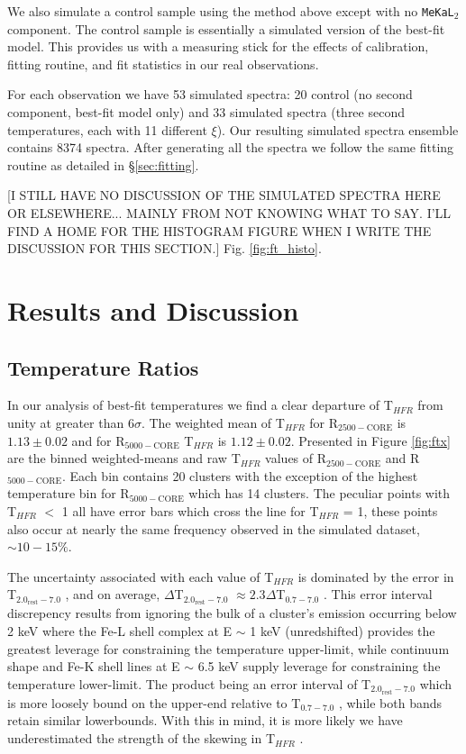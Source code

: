 \documentclass{emulateapj}
\newcommand{\tf}{T$_{HFR}$ }
\newcommand{\hard}{T$_{2.0_{\text{rest}}-7.0}$ }
\newcommand{\full}{T$_{0.7-7.0}$ }
\begin{document}
We also simulate a control sample using the method above except with no
{\tt MeKaL$_2$} component. The control sample is essentially a simulated
version of the best-fit model. This provides us with a measuring stick for
the effects of calibration, fitting routine, and fit statistics in our
real observations.

For each observation we have 53 simulated spectra: 20 control (no second
component, best-fit model only) and 33 simulated spectra (three second
temperatures, each with 11 different $\xi$). Our resulting simulated
spectra ensemble contains 8374 spectra. After generating all the
spectra we follow the same fitting routine as detailed in
\S\ref{sec:fitting}.

[I STILL HAVE NO DISCUSSION OF THE SIMULATED SPECTRA HERE OR
ELSEWHERE... MAINLY FROM NOT KNOWING WHAT TO SAY. I'LL FIND A HOME FOR
THE HISTOGRAM FIGURE WHEN I WRITE THE DISCUSSION FOR THIS SECTION.]
Fig. \ref{fig:ft_histo}.

\section{Results and Discussion} \label{sec:r&d}

\subsection{Temperature Ratios} \label{sec:tspecresults}

In our analysis of best-fit temperatures we find a clear departure of
\tf from unity at greater than $6\sigma$. The weighted mean of
\tf for R$_{2500-\text{CORE}}$ is $1.13\pm 0.02$ and for
R$_{5000-\text{CORE}}$ \tf is $1.12\pm 0.02$. Presented in Figure
\ref{fig:ftx} are the binned weighted-means and raw \tf values of
R$_{2500-\text{CORE}}$ and R$_{5000-\text{CORE}}$. Each bin contains
20 clusters with the exception of the highest temperature bin for
R$_{5000-\text{CORE}}$ which has 14 clusters. The peculiar points
with \tf $<$ 1 all have error bars which cross the line for \tf = 1,
these points also occur at nearly the same frequency observed in the
simulated dataset, $\sim 10-15\%$.

The uncertainty associated with each value of \tf is dominated by the error in
\hard, and on average, $\Delta$\hard$\approx 2.3\Delta$\full. This
error interval discrepency results from ignoring the bulk of a
cluster's emission occurring below 2 keV where the Fe-L shell complex
at E $\sim$ 1 keV (unredshifted) provides the greatest leverage for
constraining the temperature upper-limit, while continuum shape and
Fe-K shell lines at E $\sim$ 6.5 keV supply leverage for
constraining the temperature lower-limit. The product being an
error interval of \hard which is more loosely bound on the upper-end
relative to \full, while both bands retain similar lowerbounds. With this in
mind, it is more likely we have underestimated the strength of the
skewing in \tf.
\end{document}
